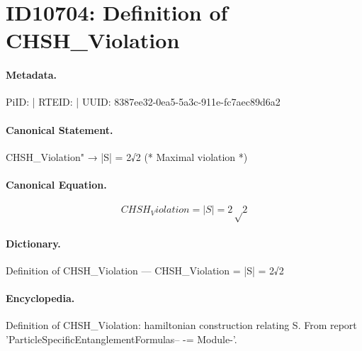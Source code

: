 \section*{ID10704: Definition of CHSH\_Violation}
\paragraph{Metadata.}
PiID:  | RTEID:  | UUID: 8387ee32-0ea5-5a3c-911e-fc7aec89d6a2

\paragraph{Canonical Statement.}
CHSH\_Violation" → |S| = 2√2 (* Maximal violation *)

\paragraph{Canonical Equation.}
\[
CHSH_Violation = |S| = 2√2
\]

\paragraph{Dictionary.}
Definition of CHSH\_Violation — CHSH\_Violation = |S| = 2√2

\paragraph{Encyclopedia.}
Definition of CHSH\_Violation: hamiltonian construction relating S. From report 'ParticleSpecificEntanglementFormulas-- -= Module-'.
